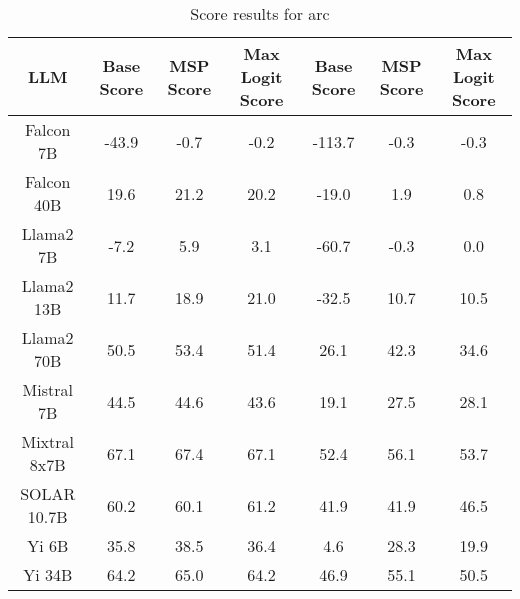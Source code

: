 \renewcommand\arraystretch{1.2}
\begin{table*}
\centering
\begin{tabular}{c|c|c|c|c|c|c}
LLM & Base Score & MSP Score & Max Logit Score & Base Score & MSP Score & Max Logit Score\\ \hline
Falcon 7B & -43.9 & -0.7 & -0.2 & -113.7 & -0.3 & -0.3\\
Falcon 40B & 19.6 & 21.2 & 20.2 & -19.0 & 1.9 & 0.8\\
Llama2 7B & -7.2 & 5.9 & 3.1 & -60.7 & -0.3 & 0.0\\
Llama2 13B & 11.7 & 18.9 & 21.0 & -32.5 & 10.7 & 10.5\\
Llama2 70B & 50.5 & 53.4 & 51.4 & 26.1 & 42.3 & 34.6\\
Mistral 7B & 44.5 & 44.6 & 43.6 & 19.1 & 27.5 & 28.1\\
Mixtral 8x7B & 67.1 & 67.4 & 67.1 & 52.4 & 56.1 & 53.7\\
SOLAR 10.7B & 60.2 & 60.1 & 61.2 & 41.9 & 41.9 & 46.5\\
Yi 6B & 35.8 & 38.5 & 36.4 & 4.6 & 28.3 & 19.9\\
Yi 34B & 64.2 & 65.0 & 64.2 & 46.9 & 55.1 & 50.5\\
\hline
\end{tabular}
\caption{Score results for arc}
\end{table*}
\label{tab:arc_score}
